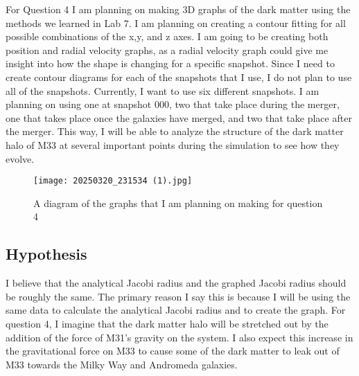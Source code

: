 \documentclass[fleqn,usenatbib]{mnras}
\begin{document}
        For Question 4 I am planning on making 3D graphs of the dark matter using the methods we learned in Lab 7. I am planning on creating a contour fitting for all possible combinations of the x,y, and z axes. I am going to be creating both position and radial velocity graphs, as a radial velocity graph could give me insight into how the shape is changing for a specific snapshot. Since I need to create contour diagrams for each of the snapshots that I use, I do not plan to use all of the snapshots. Currently, I want to use six different snapshots. I am planning on using one at snapshot 000, two that take place during the merger, one that takes place once the galaxies have merged, and two that take place after the merger. This way, I will be able to analyze the structure of the dark matter halo of M33 at several important points during the simulation to see how they evolve.
        \begin{figure}
                \centering
                \texttt{[image: 20250320\_231534 (1).jpg]}
                \label{fig:enter-label}
            \caption{ A diagram of the graphs that I am planning on making for question 4}
            \end{figure}

\subsection{Hypothesis}
I believe that the analytical Jacobi radius and the graphed Jacobi radius should be roughly the same. The primary reason I say this is because I will be using the same data to calculate the analytical Jacobi radius and to create the graph. For question 4, I imagine that the dark matter halo will be stretched out by the addition of the force of M31’s gravity on the system. I also expect this increase in the gravitational force on M33 to cause some of the dark matter to leak out of M33 towards the Milky Way and Andromeda galaxies.



 
\cite{}
\label{lastpage}
\end{document}
